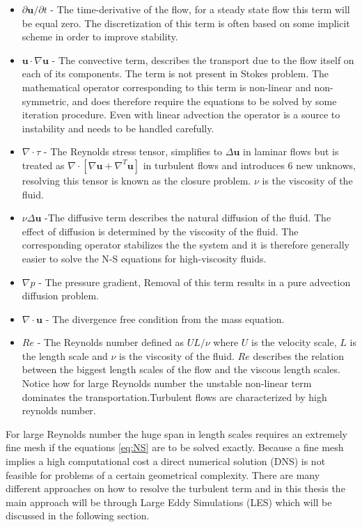 \begin{itemize}
    \item $\partial \mathbf{u} /\partial t$
     - The time-derivative of the flow, for a steady state flow this term will be equal zero.
             The discretization of this term is often based on some implicit scheme in order to improve stability.  
    \item $\mathbf{u} \cdot \nabla \mathbf{u}$
     - The convective term, describes the transport due to the flow itself on each of its components. 
    The term is not present in Stokes problem.
    The mathematical operator corresponding to this term is non-linear and non-symmetric, and does therefore require the equations to be solved 
    by some iteration procedure. Even with linear advection the operator is a source to instability and needs to be handled carefully. 
\item  $\nabla \cdot \tau$ 
       - The Reynolds stress tensor, simplifies to $ \Delta \mathbf{u}$ in laminar flows but is treated as 
       $\nabla \cdot [ \nabla \mathbf{u} + \nabla^T \mathbf{u}] $ in turbulent flows and introduces 
       6 new unknows, resolving this tensor is known as the closure problem. $\nu$ is the viscosity of the fluid.
    \item $\nu \Delta \mathbf{u}$ 
    -The diffusive term describes the natural diffusion of the fluid. The effect of diffusion is determined by the 
    viscosity of the fluid. The corresponding operator stabilizes the the system and it is therefore generally easier
    to solve the N-S equations for high-viscosity fluids. 
    \item $\nabla p$
    - The pressure gradient, Removal of this term results in a pure advection diffusion problem.
    \item $\nabla \cdot \mathbf{u}$ 
    - The divergence free condition from the mass equation.
    \item $Re$ 
    - The Reynolds number defined as $UL/\nu$ where $U$ is the velocity scale, $L$ is the length scale and $\nu$ 
      is the viscosity of the fluid. $Re$ describes the relation between the biggest length scales of the flow
      and the viscous length scales. Notice how for large Reynolds number the unstable non-linear term 
      dominates the transportation.Turbulent flows are characterized by high reynolds number.
\end{itemize}
For large Reynolds number the huge span in length scales requires an extremely fine mesh if the equations \ref{eq:NS} 
are to be solved exactly. Because a fine mesh implies a high computational cost a direct numerical solution (DNS) is not feasible for 
problems of a certain geometrical complexity. There are many different approaches on how to resolve the turbulent term and in 
this thesis the main approach will be through Large Eddy Simulations (LES) which will be discussed 
in the following section.
%

